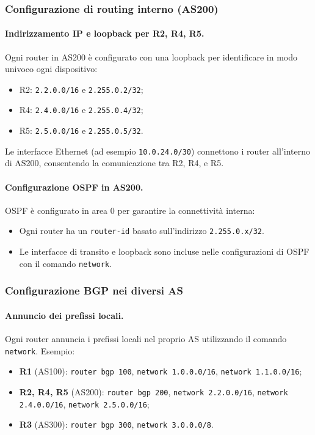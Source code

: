 \subsubsection{Configurazione di routing interno (AS200)}

\paragraph{Indirizzamento IP e loopback per R2, R4, R5.}
Ogni router in AS200 è configurato con una loopback per identificare in modo univoco ogni dispositivo:
\begin{itemize}
    \item R2: \texttt{2.2.0.0/16} e \texttt{2.255.0.2/32};
    \item R4: \texttt{2.4.0.0/16} e \texttt{2.255.0.4/32};
    \item R5: \texttt{2.5.0.0/16} e \texttt{2.255.0.5/32}.
\end{itemize}
Le interfacce Ethernet (ad esempio \texttt{10.0.24.0/30}) connettono i router all’interno di AS200, consentendo la comunicazione tra R2, R4, e R5.

\paragraph{Configurazione OSPF in AS200.}
OSPF è configurato in area 0 per garantire la connettività interna:
\begin{itemize}
    \item Ogni router ha un \texttt{router-id} basato sull’indirizzo \texttt{2.255.0.x/32}.
    \item Le interfacce di transito e loopback sono incluse nelle configurazioni di OSPF con il comando \texttt{network}.
\end{itemize}

\subsubsection{Configurazione BGP nei diversi AS}

\paragraph{Annuncio dei prefissi locali.}
Ogni router annuncia i prefissi locali nel proprio AS utilizzando il comando \texttt{network}. Esempio:
\begin{itemize}
    \item \textbf{R1} (AS100): \texttt{router bgp 100}, \texttt{network 1.0.0.0/16}, \texttt{network 1.1.0.0/16};
    \item \textbf{R2, R4, R5} (AS200): \texttt{router bgp 200}, \texttt{network 2.2.0.0/16}, \texttt{network 2.4.0.0/16}, \texttt{network 2.5.0.0/16};
    \item \textbf{R3} (AS300): \texttt{router bgp 300}, \texttt{network 3.0.0.0/8}.
\end{itemize}

